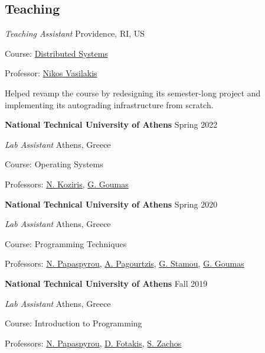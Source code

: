 \documentclass[margin,11pt]{resume}
\newcommand{\descriptionVSpace}{\vspace{0.5ex}\xspace}
\newcommand{\subsectionVSpace}{\vspace{3.5ex}\xspace}
\newcommand{\sectionVSpace}{\vspace{1ex}\xspace} %
\newcommand{\sectionVSpaceCorrection}{\vspace{-3.5ex}} %
\newcommand{\header}[1]{\textbf{#1}\xspace}
\newcommand{\institution}[1]{\header{#1}\xspace}
\newcommand{\place}[1]{#1\xspace}
\newcommand{\role}[1]{\textit{#1}\xspace}
\newcommand{\singleDate}[1]{#1\xspace}
\newcommand{\stitle}[1]{#1:\xspace}
\newenvironment{rSubsection}{}{\par\subsectionVSpace}
\newenvironment{rSection}[1]{\sectionVSpaceCorrection\section{#1}\xspace}{\sectionVSpace\par}
\newenvironment{jobDuties}{\descriptionVSpace}{\par}
\begin{document}
\begin{resume}
\begin{rSection}{Teaching}
\begin{rSubsection}
			\role{Teaching Assistant} \hfill \place{Providence, RI, US}

			\stitle{Course} \href{https://cs.brown.edu/courses/csci1380/s24/}{Distributed Systems}

			\stitle{Professor} \href{https://nikos.vasilak.is}{Nikos Vasilakis}

			\begin{jobDuties}
				Helped revamp the course by redesigning its semester-long project and implementing its autograding infrastructure from scratch.
			\end{jobDuties}
		\end{rSubsection}

		\begin{rSubsection}
			\institution{National Technical University of Athens} \hfill \singleDate{Spring 2022}

			\role{Lab Assistant} \hfill \place{Athens, Greece}

			\stitle{Course} Operating Systems

			\stitle{Professors} \href{http://www.cslab.ntua.gr/~nkoziris/}{N. Koziris}, \href{http://www.cslab.ntua.gr/~goumas/}{G. Goumas}
		\end{rSubsection}

		\begin{rSubsection}
			\institution{National Technical University of Athens} \hfill \singleDate{Spring 2020}

			\role{Lab Assistant} \hfill \place{Athens, Greece}

			\stitle{Course} Programming Techniques

			\stitle{Professors} \href{http://www.softlab.ntua.gr/~nickie/}{N. Papaspyrou}, \href{http://users.softlab.ntua.gr/~pagour/}{A. Pagourtzis}, \href{http://www.image.ntua.gr/~gstam/}{G. Stamou}, \href{http://www.cslab.ntua.gr/~goumas/}{G. Goumas}
		\end{rSubsection}

		\begin{rSubsection}
			\institution{National Technical University of Athens} \hfill \singleDate{Fall 2019}

			\role{Lab Assistant} \hfill \place{Athens, Greece}

			\stitle{Course} Introduction to Programming

			\stitle{Professors} \href{http://www.softlab.ntua.gr/~nickie/}{N. Papaspyrou}, \href{http://www.softlab.ntua.gr/~fotakis/}{D. Fotakis}, \href{https://en.wikipedia.org/wiki/Stathis_Zachos}{S. Zachos}
		\end{rSubsection}
	\end{rSection}


\end{resume}
\end{document}

